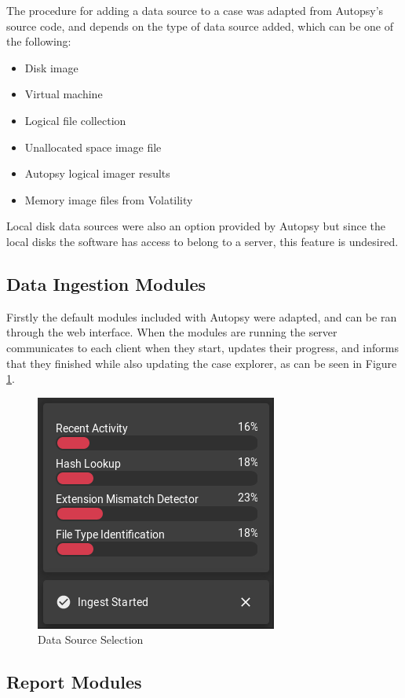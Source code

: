 The procedure for adding a data source to a case was adapted from Autopsy's source code, and depends on the type of data source added, which can be one of the following:
\begin{itemize}
 \item Disk image
 \item Virtual machine
 \item Logical file collection
 \item Unallocated space image file
 \item Autopsy logical imager results
 \item Memory image files from Volatility
\end{itemize}

Local disk data sources were also an option provided by Autopsy but since the local disks the software has access to belong to a server, this feature is undesired.

\subsection{Data Ingestion Modules}

Firstly the default modules included with Autopsy were adapted, and can be ran through the web interface. When the modules are running the server communicates to each client when
they start, updates their progress, and informs that they finished while also updating the case explorer, as can be seen in Figure \ref{fig:modules}.

\begin{figure}[h]
 \centering
 \includegraphics[width=0.5\linewidth]{imgs/modules.png}
 \caption{Data Source Selection}
 \label{fig:modules}
\end{figure}



\subsection{Report Modules}
